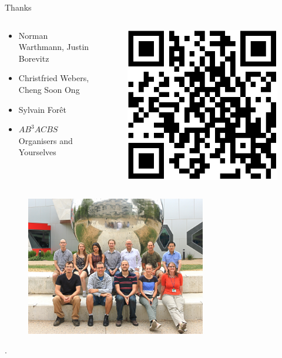 \documentclass[t]{beamer}
\begin{document}
\begin{frame}{Thanks}
  \begin{columns}
    \begin{column}{0.7\textwidth}
      \begin{itemize}
        \item Norman Warthmann, Justin Borevitz
        \item Christfried Webers, Cheng Soon Ong
        \item Sylvain For\^{e}t
        \item $AB^3ACBS$ Organisers and Yourselves
      \end{itemize}
    \end{column}
    \begin{column}{0.2\textwidth}
      \begin{figure}
        \centering
        \includegraphics[width=\textwidth]{img/link.png}
      \end{figure}
    \end{column}
  \end{columns}
  \begin{figure}
    \centering
    \includegraphics[width=0.7\textwidth]{img/lab.jpg}
  \end{figure}
\end{frame}

\begin{frame}[shrink=40]{}
  \printbibliography
  \vfill
  .
\end{frame}
\end{document}
